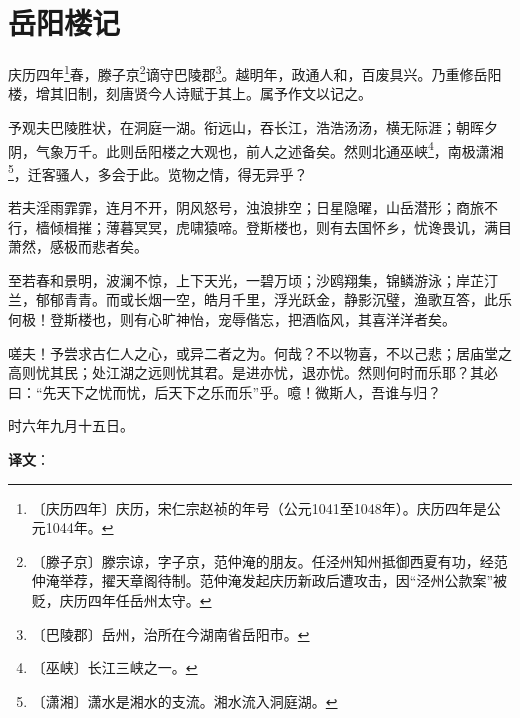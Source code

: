 \documentclass[12pt,UTF-8,openany,a4]{ctexbook}
\begin{document}
\chapter{岳阳楼记}

\begin{large}
    
    庆历四年\footnote{〔庆历四年〕\yiwen 庆历，宋仁宗赵祯的年号（公元1041至1048年）。庆历四年是公元1044年。}春，滕子京\footnote{〔滕子京〕\yiwen 滕宗谅，字子京，范仲淹的朋友。任泾州知州抵御西夏有功，经范仲淹举荐，擢天章阁待制。范仲淹发起庆历新政后遭攻击，因“泾州公款案”被贬，庆历四年任岳州太守。}谪守巴陵郡\footnote{〔巴陵郡〕\yiwen 岳州，治所在今湖南省岳阳市。}。越明年，政通人和，百废具兴。乃重修岳阳楼，增其旧制，刻唐贤今人诗赋于其上。属予作文以记之。
    
    予观夫巴陵胜状，在洞庭一湖。衔远山，吞长江，浩浩汤汤，横无际涯；朝晖夕阴，气象万千。此则岳阳楼之大观也，前人之述备矣。然则北通巫峡\footnote{〔巫峡〕\yiwen 长江三峡之一。}，南极潇湘\footnote{〔潇湘〕\yiwen 潇水是湘水的支流。湘水流入洞庭湖。}，迁客骚人，多会于此。览物之情，得无异乎？
    
    若夫淫雨霏霏，连月不开，阴风怒号，浊浪排空；日星隐曜，山岳潜形；商旅不行，樯倾楫摧；薄暮冥冥，虎啸猿啼。登斯楼也，则有去国怀乡，忧谗畏讥，满目萧然，感极而悲者矣。
    
    至若春和景明，波澜不惊，上下天光，一碧万顷；沙鸥翔集，锦鳞游泳；岸芷汀兰，郁郁青青。而或长烟一空，皓月千里，浮光跃金，静影沉璧，渔歌互答，此乐何极！登斯楼也，则有心旷神怡，宠辱偕忘，把酒临风，其喜洋洋者矣。
    
    嗟夫！予尝求古仁人之心，或异二者之为。何哉？不以物喜，不以己悲；居庙堂之高则忧其民；处江湖之远则忧其君。是进亦忧，退亦忧。然则何时而乐耶？其必曰：“先天下之忧而忧，后天下之乐而乐”乎。噫！微斯人，吾谁与归？
    
    时六年九月十五日。

\end{large}


\newpage

\begin{Large}
   \noindent \textbf{译文}：
\end{Large}

\vspace{1em}
\end{document}
